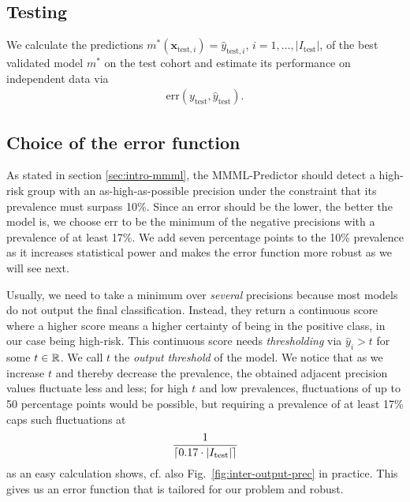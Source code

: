 \subsection{Testing}

We calculate the predictions $m^*(\mathbf{x}_{\text{test}, i}) = \hat{y}_{\text{test}, i}$, $i = 
1, \ldots, |I_\text{test}|$, of the 
best validated model $m^*$ on the test cohort and estimate its performance on independent data via 
\begin{align}
    \text{err}(y_\text{test}, \hat{y}_\text{test}).
\end{align}

\subsection{Choice of the error function}\label{subsec:error-function}

As stated in section \ref{sec:intro-mmml}, the MMML-Predictor should detect a high-risk group 
with an as-high-as-possible precision under the constraint that its prevalence must surpass 
\num{10}\%. Since an error should be the lower, the better the model is, we choose 
$\text{err}$ to be the minimum of the negative precisions with a prevalence of at least 17\%. We 
add seven percentage points to the \num{10}\% prevalence as it increases statistical power and makes 
the error function more robust as we will see next. 

Usually, we need 
to take a minimum over \textit{several} precisions because most models do not output the final 
classification.
Instead, they return a continuous score where a higher score means a higher certainty of being
in the positive class, in our case being high-risk. This continuous score needs 
\textit{thresholding} via $\hat{y}_i > t$ for some $t \in \RR$. We call $t$ the \textit{output
threshold} of the model. 
We notice that as we increase $t$ and thereby decrease the prevalence, the obtained 
adjacent precision values fluctuate less and less; for high $t$ and low 
prevalences, fluctuations of up to \num{50} percentage points would be possible, but requiring a 
prevalence of at least 17\% caps such fluctuations at 
\begin{align}
    \frac{1}{\ceil*{\num{0.17} \cdot |I_\text{test}|}}
\end{align}
as an easy calculation shows, cf. also Fig.\ 
\ref{fig:inter-output-prec} in practice. This gives us an error function that is tailored 
for our problem and robust.


